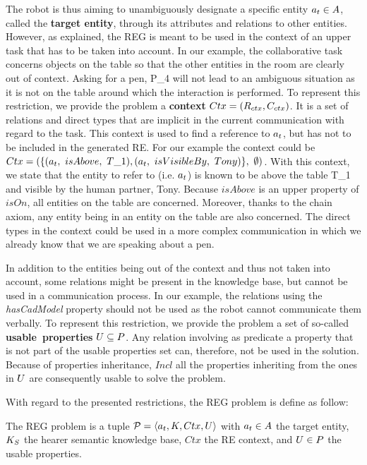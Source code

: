 The robot is thus aiming to unambiguously designate a specific entity $a_t \in A$, called the \textbf{target entity}, through its attributes and relations to other entities. However, as explained, the REG is meant to be used in the context of an upper task that has to be taken into account. In our example, the collaborative task concerns objects on the table so that the other entities in the room are clearly out of context. Asking for a pen, P\_4 will not lead to an ambiguous situation as it is not on the table around which the interaction is performed. To represent this restriction, we provide the problem a \textbf{context} $Ctx = (R_{ctx}, C_{ctx})$. It is a set of relations and direct types that are implicit in the current communication with regard to the task. This context is used to find a reference to $a_t$, but has not to be included in the generated RE. For our example the context could be $Ctx = (\{ (a_t,\ isAbove,\ T\_1), (a_t,\ isVisibleBy,\ Tony) \},\ \emptyset)$. With this context, we state that the entity to refer to (i.e. $a_t$) is known to be above the table T\_1 and visible by the human partner, Tony. Because $isAbove$ is an upper property of $isOn$, all entities on the table are concerned. Moreover, thanks to the chain axiom, any entity being in an entity on the table are also concerned. The direct types in the context could be used in a more complex communication in which we already know that we are speaking about a pen.

In addition to the entities being out of the context and thus not taken into account, some relations might be present in the knowledge base, but cannot be used in a communication process. In our example, the relations using the \textit{hasCadModel} property should not be used as the robot cannot communicate them verbally. To represent this restriction, we provide the problem a set of so-called \mbox{\textbf{usable properties}} $U \subseteq P$. Any relation involving as predicate a property that is not part of the usable properties set can, therefore, not be used in the solution. Because of properties inheritance, $Incl$ all the properties inheriting from the ones in $U$ are consequently usable to solve the problem. 


With regard to the presented restrictions, the REG problem is define as follow:

\begin{definition}
The REG problem is a tuple $\mathcal{P} = \langle a_t, K, Ctx, U \rangle$ with $a_t \in A$ the target entity, $K_S$ the hearer semantic knowledge base, $Ctx$ the RE context, and $U \in P$ the usable properties.
\end{definition}

